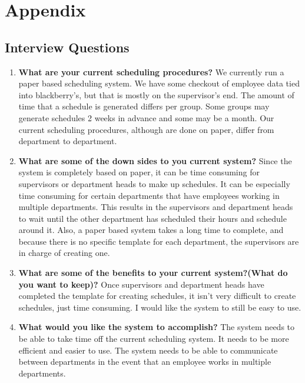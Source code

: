 \documentclass[letterpaper,12pt]{report}
\begin{document}
\appendix
\part{Appendix}
\chapter{Interview Questions}
\lhead{\textcolor{custom}{\appendixname \space \thechapter}}
\begin{enumerate}
 \item \textbf{What are your current scheduling procedures?}\newline
We currently run a paper based scheduling system. We have some checkout of employee data tied into blackberry’s, but that is mostly on the supervisor’s end. The amount of time that a schedule is generated differs per group. Some groups may generate schedules 2 weeks in advance and some may be a month. Our current scheduling procedures, although are done on paper, differ from department to department.
 \item \textbf{What are some of the down sides to you current system?} \newline
 Since the system is completely based on paper, it can be time consuming for supervisors or department heads to make up schedules. It can be especially time consuming for certain departments that have employees working in multiple departments. This results in the supervisors and department heads to wait until the other department has scheduled their hours and schedule around it. Also, a paper based system takes a long time to complete, and because there is no specific template for each department, the supervisors are in charge of creating one.

 \item \textbf{What are some of the benefits to your current system?(What do you want to keep)?}\newline
 Once supervisors and department heads have completed the template for creating schedules, it isn’t very difficult to create schedules, just time consuming. I would like the system to still be easy to use. 
 \item \textbf{What would you like the system to accomplish?}\newline
 The system needs to be able to take time off the current scheduling system.  It needs to be more efficient and easier to use. The system needs to be able to communicate between departments in the event that an employee works in multiple departments. 


\end{enumerate}
\end{document}
